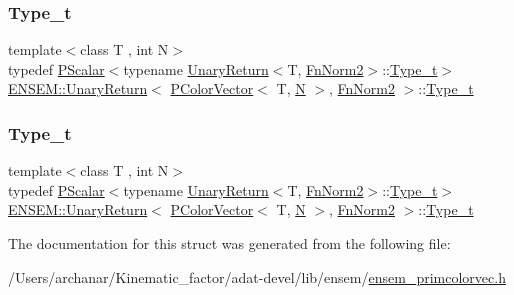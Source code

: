 \subsubsection{\texorpdfstring{Type\_t}{Type\_t}\hspace{0.1cm}{\footnotesize\ttfamily [2/3]}}
{\footnotesize\ttfamily template$<$class T , int N$>$ \\
typedef \mbox{\hyperlink{classENSEM_1_1PScalar}{P\+Scalar}}$<$typename \mbox{\hyperlink{structENSEM_1_1UnaryReturn}{Unary\+Return}}$<$T, \mbox{\hyperlink{structENSEM_1_1FnNorm2}{Fn\+Norm2}}$>$\+::\mbox{\hyperlink{structENSEM_1_1UnaryReturn_3_01PColorVector_3_01T_00_01N_01_4_00_01FnNorm2_01_4_a5a7744f2bf5fb66bb4cadbb4b85098af}{Type\+\_\+t}}$>$ \mbox{\hyperlink{structENSEM_1_1UnaryReturn}{E\+N\+S\+E\+M\+::\+Unary\+Return}}$<$ \mbox{\hyperlink{classENSEM_1_1PColorVector}{P\+Color\+Vector}}$<$ T, \mbox{\hyperlink{adat__devel_2lib_2hadron_2operator__name__util_8cc_a7722c8ecbb62d99aee7ce68b1752f337}{N}} $>$, \mbox{\hyperlink{structENSEM_1_1FnNorm2}{Fn\+Norm2}} $>$\+::\mbox{\hyperlink{structENSEM_1_1UnaryReturn_3_01PColorVector_3_01T_00_01N_01_4_00_01FnNorm2_01_4_a5a7744f2bf5fb66bb4cadbb4b85098af}{Type\+\_\+t}}}

\mbox{\label{structENSEM_1_1UnaryReturn_3_01PColorVector_3_01T_00_01N_01_4_00_01FnNorm2_01_4_a5a7744f2bf5fb66bb4cadbb4b85098af}} 
\subsubsection{\texorpdfstring{Type\_t}{Type\_t}\hspace{0.1cm}{\footnotesize\ttfamily [3/3]}}
{\footnotesize\ttfamily template$<$class T , int N$>$ \\
typedef \mbox{\hyperlink{classENSEM_1_1PScalar}{P\+Scalar}}$<$typename \mbox{\hyperlink{structENSEM_1_1UnaryReturn}{Unary\+Return}}$<$T, \mbox{\hyperlink{structENSEM_1_1FnNorm2}{Fn\+Norm2}}$>$\+::\mbox{\hyperlink{structENSEM_1_1UnaryReturn_3_01PColorVector_3_01T_00_01N_01_4_00_01FnNorm2_01_4_a5a7744f2bf5fb66bb4cadbb4b85098af}{Type\+\_\+t}}$>$ \mbox{\hyperlink{structENSEM_1_1UnaryReturn}{E\+N\+S\+E\+M\+::\+Unary\+Return}}$<$ \mbox{\hyperlink{classENSEM_1_1PColorVector}{P\+Color\+Vector}}$<$ T, \mbox{\hyperlink{adat__devel_2lib_2hadron_2operator__name__util_8cc_a7722c8ecbb62d99aee7ce68b1752f337}{N}} $>$, \mbox{\hyperlink{structENSEM_1_1FnNorm2}{Fn\+Norm2}} $>$\+::\mbox{\hyperlink{structENSEM_1_1UnaryReturn_3_01PColorVector_3_01T_00_01N_01_4_00_01FnNorm2_01_4_a5a7744f2bf5fb66bb4cadbb4b85098af}{Type\+\_\+t}}}



The documentation for this struct was generated from the following file\+:\begin{DoxyCompactItemize}
\item 
/\+Users/archanar/\+Kinematic\+\_\+factor/adat-\/devel/lib/ensem/\mbox{\hyperlink{adat-devel_2lib_2ensem_2ensem__primcolorvec_8h}{ensem\+\_\+primcolorvec.\+h}}\end{DoxyCompactItemize}
